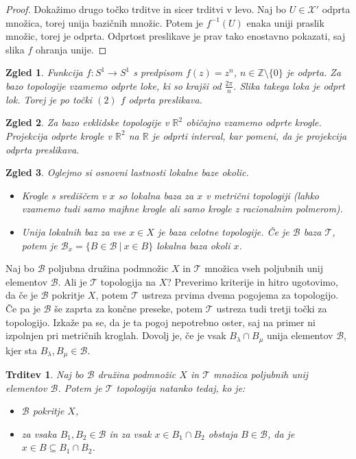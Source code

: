 \documentclass[10pt, a4paper]{article}
\newtheorem{trditev}[izr]{Trditev}
\newtheorem{zgled}{Zgled}[section]
\newenvironment{noticeC}{%
  \tcolorbox[%
  notitle,
  empty,
  enhanced,  %
  breakable,
  coltext=black, 
  fontupper=\rmfamily,
  parbox=false,
  noparskip,
  sharp corners,
  boxrule=-1pt,  %
  frame hidden,
  left=7pt,  %
  right=7pt,
  top=5pt,
  bottom=5pt,
  before skip=2.5ex plus 2pt,
  after skip=2.5ex plus 2pt,
  overlay unbroken and last={%
  },
  ]}
{\endtcolorbox}
\newenvironment{dokaz}%
  {\begin{noticeC}\begin{proof}}%
  {\end{proof}\end{noticeC}}
\newcommand{\Z}{\mathbb {Z}}
\newcommand{\R}{\mathbb {R}}
\newcommand{\topo}[1]{\mathcal{#1}}
\begin{document}
\begin{dokaz}
  Dokažimo drugo točko trditve in sicer trditvi v levo.
  Naj bo $U \in \mathcal{X'}$ odprta množica, torej unija bazičnih množic.
  Potem je $f^{-1} (U)$ enaka uniji praslik množic, torej je odprta.
  Odprtost preslikave je prav tako enostavno pokazati, saj slika $f$ ohranja unije.
\end{dokaz}

\begin{zgled}
  Funkcija $f: S^1 \to S^1$ s predpisom $f(z) = z^n$, $n \in \Z \setminus \{0\}$ je odprta.
  Za bazo topologije vzamemo odprte loke, ki so krajši od $\frac{2 \pi}{n}$.
  Slika takega loka je odprt lok. Torej je po točki $(2)$ $f$ odprta preslikava.
\end{zgled}

\begin{zgled}
  Za bazo evklidske topologije v $\R^2$ običajno vzamemo odprte krogle.
  Projekcija odprte krogle v $\R^2$ na $\R$ je odprti interval, kar pomeni, da je projekcija odprta preslikava.
\end{zgled}

\begin{zgled}
  Oglejmo si osnovni lastnosti lokalne baze okolic.
  \begin{itemize}
    \item Krogle s središčem v $x$ so lokalna baza za $x$ v metrični topologiji 
    (lahko vzamemo tudi samo majhne krogle ali samo krogle z racionalnim polmerom).
    \item Unija lokalnih baz za vse $x \in X$ je baza celotne topologije.
    Če je $\mathcal{B}$ baza $\mathcal{T}$, potem je $\mathcal{B}_x = \{B \in \mathcal{B}\ |\ x \in B\}$
    lokalna baza okoli $x$.
  \end{itemize}
\end{zgled}

Naj bo $\mathcal{B}$ poljubna družina podmnožic $X$ in $\mathcal{T}$ množica vseh poljubnih unij elementov $\mathcal{B}$.
Ali je $\mathcal{T}$ topologija na $X$? Preverimo kriterije in hitro ugotovimo, da če je $\mathcal{B}$ pokritje $X$,
potem $\topo{T}$ ustreza prvima dvema pogojema za topologijo.
Če pa je $\mathcal{B}$ še zaprta za končne preseke, potem $\mathcal{T}$ ustreza tudi tretji točki za topologijo.
Izkaže pa se, da je ta pogoj nepotrebno oster, saj na primer ni izpolnjen pri metričnih kroglah.
Dovolj je, če je vsak $B_\lambda \cap B_\mu$
unija elementov $\mathcal{B}$, kjer sta $B_\lambda, B_\mu \in \topo{B}$.

\begin{trditev}
  Naj bo $\mathcal{B}$ družina podmnožic $X$ in $\mathcal{T}$ množica poljubnih unij elementov $\mathcal{B}$.
  Potem je $\mathcal{T}$ topologija natanko tedaj, ko je:
  \begin{itemize}
    \item $\mathcal{B}$ pokritje $X$,
    \item za vsaka $B_1, B_2 \in \mathcal{B}$ in za vsak $x \in B_1 \cap B_2$ obstaja $B \in \mathcal{B}$, da je $x \in B \subseteq B_1 \cap B_2$.
  \end{itemize}
\end{trditev}
\end{document}
